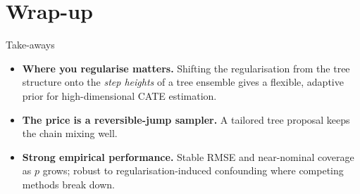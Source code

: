 \documentclass[10pt,aspectratio=169]{beamer}
\begin{document}
\section{Wrap-up}


\begin{frame}{Take-aways}
\begin{itemize}
\item \textbf{Where you regularise matters.} Shifting the regularisation from the tree structure onto the \emph{step heights} of a tree ensemble gives a flexible, adaptive prior for high-dimensional CATE estimation.  \vspace{0.7cm}
  \item \textbf{The price is a reversible-jump sampler.} A tailored tree proposal keeps the chain mixing well.
  \vspace{0.7cm}
  \item \textbf{Strong empirical performance.} Stable RMSE and near-nominal coverage as $p$ grows; robust to regularisation-induced confounding where competing methods break down.
\end{itemize}
\end{frame}
\end{document}
